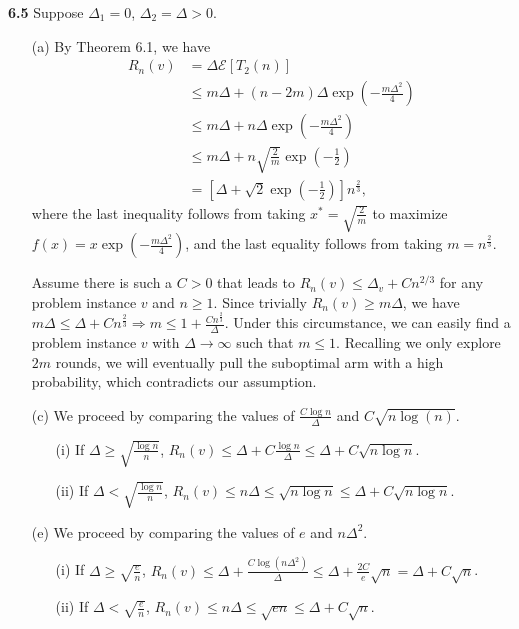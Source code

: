 \noindent\textbf{6.5}
Suppose $\Delta_1 = 0$, $\Delta_2 = \Delta > 0$.

\begin{enumerate}
    \item[(a)] By Theorem 6.1, we have
    \begin{equation*}
        \begin{aligned}
            R_n(v)
            &= \Delta \mathcal{E}[T_2(n)]\\
            &\leq m\Delta + (n - 2m)\Delta \exp (-\frac{m\Delta^2}{4})\\
            &\leq m\Delta + n\Delta \exp (-\frac{m\Delta^2}{4})\\
            &\leq m\Delta + n\sqrt{\frac{2}{m}}\exp(-\frac{1}{2})\\
            &=[\Delta + \sqrt{2}\exp(-\frac{1}{2})]n^{\frac{2}{3}},
        \end{aligned}
    \end{equation*}
    where the last inequality follows from taking $x^* = \sqrt{\frac{2}{m}}$ to maximize $f(x) = x\exp(-\frac{m\Delta^2}{4})$,
    and the last equality follows from taking $m = n^{\frac{2}{3}}$.

    Assume there is such a $C > 0$ that leads to $R_{n}(v) \leq \Delta_{v}+C n^{2 / 3}$ for any problem instance $v$ and $n \geq 1$.
    Since trivially $R_n(v) \geq m\Delta$, we have $m\Delta \leq \Delta + Cn^{\frac{2}{3}} \Rightarrow m \leq 1 + \frac{Cn^{\frac{2}{3}}}{\Delta}$.
    Under this circumstance, we can easily find a problem instance $v$ with $\Delta \rightarrow \infty$ such that $m \leq 1$.
    Recalling we only explore $2m$ rounds, we will eventually pull the suboptimal arm with a high probability, which contradicts our assumption.

    \item[(c)] We proceed by comparing the values of $\frac{C \log n}{\Delta}$ and $C \sqrt{n \log (n)}$.
    \begin{enumerate}
        \item[(i)] If $\Delta \geq \sqrt{\frac{\log n}{n}}$, $R_n(v) \leq \Delta + C\frac{\log n}{\Delta} \leq \Delta + C\sqrt{n\log n}$.
        \item[(ii)] If $\Delta < \sqrt{\frac{\log n}{n}}$, $R_n(v) \leq n \Delta \leq \sqrt{n \log n} \leq \Delta + C\sqrt{n\log n}$.
    \end{enumerate}

    \item[(e)] We proceed by comparing the values of $e$ and $n \Delta^2$.
    \begin{enumerate}
        \item[(i)] If $\Delta \geq \sqrt{\frac{e}{n}}$, $R_n(v) \leq \Delta + \frac{C\log(n\Delta^2)}{\Delta} \leq \Delta + \frac{2C}{e}\sqrt{n} = \Delta + C\sqrt{n}$.
        \item[(ii)] If $\Delta < \sqrt{\frac{e}{n}}$, $R_n(v) \leq n \Delta \leq \sqrt{en} \leq \Delta + C\sqrt{n}$.
    \end{enumerate}
\end{enumerate}

